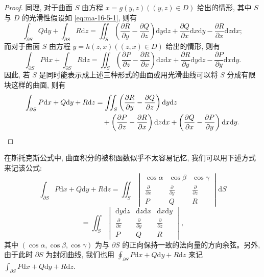 \begin{proof}
同理, 对于曲面 $S$ 由方程 $x=g(y,z)((y,z)\in D)$ 给出的情形, 其中 $S$ 与 $D$ 的光滑性假设如 \eqref{eq:ma-16-5-1}, 则有
\[
  \int_{\partial S}Q\mathrm dy+\int_{\partial S}R\mathrm dz
  =\iint_S\left(\frac{\partial R}{\partial y}-\frac{\partial Q}{\partial z}\right)\mathrm dy\mathrm dz
    +\frac{\partial Q}{\partial x}\mathrm dx\mathrm dy-\frac{\partial R}{\partial x}\mathrm dz\mathrm dx;
\]
而对于曲面 $S$ 由方程 $y=h(z,x)((z,x)\in D)$ 给出的情形, 则有
\[
  \int_{\partial S}P\mathrm dx+\int_{\partial S}R\mathrm dz
  =\iint_S\left(\frac{\partial P}{\partial z}-\frac{\partial R}{\partial x}\right)\mathrm dz\mathrm dx
    +\frac{\partial R}{\partial y}\mathrm dy\mathrm dz-\frac{\partial P}{\partial y}\mathrm dx\mathrm dy.
\]
因此, 若 $S$ 是同时能表示成上述三种形式的曲面或用光滑曲线可以将 $S$ 分成有限块这样的曲面, 则有
\[
\begin{aligned}
  \int_{\partial S}P\mathrm dx+Q\mathrm dy+R\mathrm dz
  &=\iint_S\left(\frac{\partial R}{\partial y}-\frac{\partial Q}{\partial z}\right)\mathrm dy\mathrm dz\\
  &\quad+\left(\frac{\partial P}{\partial z}-\frac{\partial R}{\partial x}\right)\mathrm dz\mathrm dx
    +\left(\frac{\partial Q}{\partial x}-\frac{\partial P}{\partial y}\right)\mathrm dx\mathrm dy.
\end{aligned}
\qedhere
\]
\end{proof}


在斯托克斯公式中, 曲面积分的被积函数似乎不太容易记忆, 我们可以用下述方式来记该公式:
\[
  \int_{\partial S}P\mathrm dx+Q\mathrm dy+R\mathrm dz
  =\iint_S
  \begin{vmatrix}
    \cos\alpha&\cos\beta&\cos\gamma\\
    \frac{\partial}{\partial x}&\frac{\partial}{\partial y}&\frac{\partial}{\partial z}\\
    P&Q&R
  \end{vmatrix}\mathrm dS
\]
\[
  =\iint_S
  \begin{vmatrix}
    \mathrm dy\mathrm dz&\mathrm dz\mathrm dx&\mathrm dx\mathrm dy\\
    \frac{\partial}{\partial x}&\frac{\partial}{\partial y}&\frac{\partial}{\partial z}\\
    P&Q&R
  \end{vmatrix},
\]
其中 $(\cos\alpha,\cos\beta,\cos\gamma)$ 为与 $\partial S$ 的正向保持一致的法向量的方向余弦。另外, 由于此时 $\partial S$ 为封闭曲线, 我们也用 $\oint_{\partial S}P\mathrm dx+Q\mathrm dy+R\mathrm dz$ 来记 $\int_{\partial S}P\mathrm dx+Q\mathrm dy+R\mathrm dz$.

